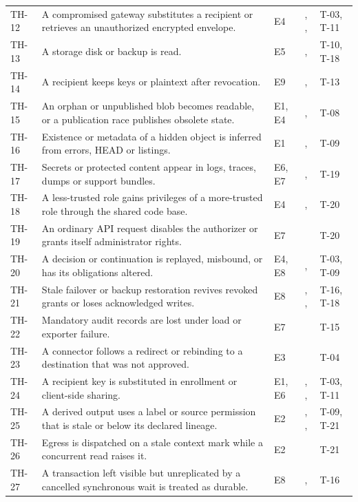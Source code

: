 \begin{longtable}{@{}P{0.07\textwidth}P{0.34\textwidth}P{0.08\textwidth}P{0.29\textwidth}P{0.12\textwidth}@{}}
TH-12 & A compromised gateway substitutes a recipient or retrieves an unauthorized encrypted envelope. & E4 & , ,  & T-03, T-11\\
TH-13 & A storage disk or backup is read. & E5 & ,  & T-10, T-18\\
TH-14 & A recipient keeps keys or plaintext after revocation. & E9 & ,  & T-13\\
TH-15 & An orphan or unpublished blob becomes readable, or a publication race publishes obsolete state. & E1, E4 & ,  & T-08\\
TH-16 & Existence or metadata of a hidden object is inferred from errors, HEAD or listings. & E1 & ,  & T-09\\
TH-17 & Secrets or protected content appear in logs, traces, dumps or support bundles. & E6, E7 & ,  & T-19\\
TH-18 & A less-trusted role gains privileges of a more-trusted role through the shared code base. & E4 & ,  & T-20\\
TH-19 & An ordinary API request disables the authorizer or grants itself administrator rights. & E7 &  & T-20\\
TH-20 & A decision or continuation is replayed, misbound, or has its obligations altered. & E4, E8 & ,  & T-03, T-09\\
TH-21 & Stale failover or backup restoration revives revoked grants or loses acknowledged writes. & E8 & , ,  & T-16, T-18\\
TH-22 & Mandatory audit records are lost under load or exporter failure. & E7 &  & T-15\\
TH-23 & A connector follows a redirect or rebinding to a destination that was not approved. & E3 &  & T-04\\
TH-24 & A recipient key is substituted in enrollment or client-side sharing. & E1, E6 & , ,  & T-03, T-11\\
TH-25 & A derived output uses a label or source permission that is stale or below its declared lineage. & E2 & , ,  & T-09, T-21\\
TH-26 & Egress is dispatched on a stale context mark while a concurrent read raises it. & E2 &  & T-21\\
TH-27 & A transaction left visible but unreplicated by a cancelled synchronous wait is treated as durable. & E8 & ,  & T-16\\
\bottomrule
\end{longtable}

